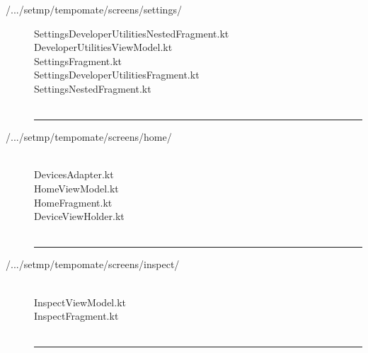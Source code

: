 \begin{enumerate}[label=\alph*]
\begin{description}
    \item[/.../setmp/tempomate/screens/settings/] \hfill 
    \footnotesize
        SettingsDeveloperUtilitiesNestedFragment.kt  \\
        DeveloperUtilitiesViewModel.kt  \\
        SettingsFragment.kt  \\
        SettingsDeveloperUtilitiesFragment.kt  \\
        SettingsNestedFragment.kt  \\\\

            \vspace{-0.2cm}
      \hrule
      \vspace{0.2cm}
      
    \item[/.../setmp/tempomate/screens/home/] \hfill \\
    \footnotesize
        DevicesAdapter.kt  \\
        HomeViewModel.kt  \\
        HomeFragment.kt  \\
        DeviceViewHolder.kt  \\\\

            \vspace{-0.2cm}
      \hrule
      \vspace{0.2cm}
      
    \item[/.../setmp/tempomate/screens/inspect/] \hfill \\
    \footnotesize
        InspectViewModel.kt  \\
        InspectFragment.kt  \\\\

            \vspace{-0.2cm}
      \hrule
      \vspace{0.2cm}
      

\end{description}
\end{enumerate}
